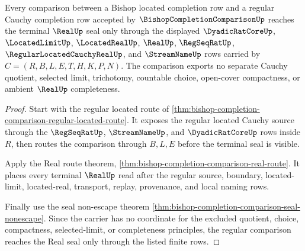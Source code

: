 \begin{theorem}\label{thm:bishopcompletioncomparison-regular-seal}
Every comparison between a Bishop located completion row and a regular Cauchy completion row accepted by $\BishopCompletionComparisonUp$ reaches the terminal $\RealUp$ seal only through the displayed $\DyadicRatCoreUp$, $\LocatedLimitUp$, $\LocatedRealUp$, $\RealUp$, $\RegSeqRatUp$, $\RegularLocatedCauchyRealUp$, and $\StreamNameUp$ rows carried by $C=(R,B,L,E,T,H,K,P,N)$. The comparison exports no separate Cauchy quotient, selected limit, trichotomy, countable choice, open-cover compactness, or ambient $\RealUp$ completeness.
\end{theorem}
\begin{proof}
Start with the regular located route of \autoref{thm:bishop-completion-comparison-regular-located-route}. It exposes the regular located Cauchy source through the $\RegSeqRatUp$, $\StreamNameUp$, and $\DyadicRatCoreUp$ rows inside $R$, then routes the comparison through $B,L,E$ before the terminal seal is visible.

Apply the Real route theorem, \autoref{thm:bishop-completion-comparison-real-route}. It places every terminal $\RealUp$ read after the regular source, boundary, located-limit, located-real, transport, replay, provenance, and local naming rows.

Finally use the seal non-escape theorem \autoref{thm:bishop-completion-comparison-seal-nonescape}. Since the carrier has no coordinate for the excluded quotient, choice, compactness, selected-limit, or completeness principles, the regular comparison reaches the Real seal only through the listed finite rows.
\end{proof}

